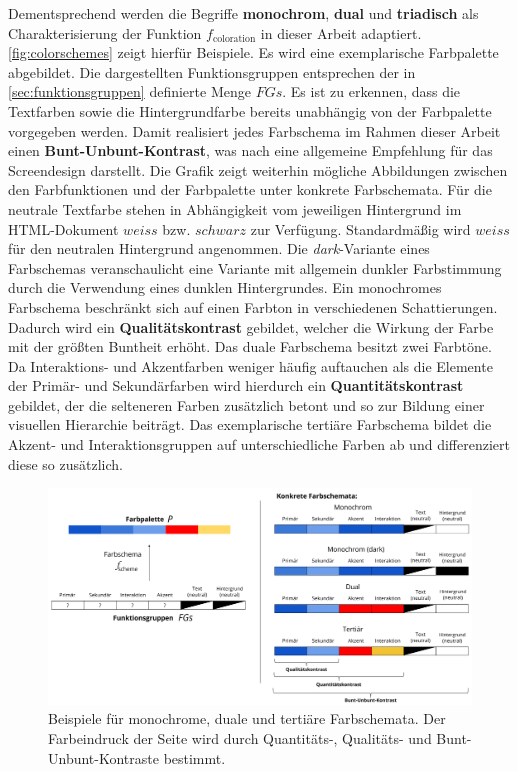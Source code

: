 Dementsprechend werden die Begriffe \textbf{monochrom}, \textbf{dual} und \textbf{triadisch} als Charakterisierung der Funktion $f_\text{coloration}$ in dieser Arbeit adaptiert. \autoref{fig:colorschemes} zeigt hierfür Beispiele. Es wird eine exemplarische Farbpalette abgebildet. Die dargestellten Funktionsgruppen entsprechen der in \autoref{sec:funktionsgruppen} definierte Menge $FGs$. Es ist zu erkennen, dass die Textfarben sowie die Hintergrundfarbe bereits unabhängig von der Farbpalette vorgegeben werden. Damit realisiert jedes Farbschema im Rahmen dieser Arbeit einen \textbf{Bunt-Unbunt-Kontrast}, was nach \citep{webx0} eine allgemeine Empfehlung für das Screendesign darstellt. Die Grafik zeigt weiterhin mögliche Abbildungen zwischen den Farbfunktionen und der Farbpalette unter \glqq{}konkrete Farbschemata\grqq{}. Für die neutrale Textfarbe stehen in Abhängigkeit vom jeweiligen Hintergrund im HTML-Dokument $weiss$ bzw. $schwarz$ zur Verfügung. Standardmäßig wird $weiss$ für den neutralen Hintergrund angenommen. Die \emph{dark}-Variante eines Farbschemas veranschaulicht eine Variante mit allgemein dunkler Farbstimmung durch die Verwendung eines dunklen Hintergrundes. Ein monochromes Farbschema beschränkt sich auf einen Farbton in verschiedenen Schattierungen. Dadurch wird ein \textbf{Qualitätskontrast} gebildet, welcher die Wirkung der Farbe mit der größten Buntheit erhöht. Das duale Farbschema besitzt zwei Farbtöne. Da Interaktions- und Akzentfarben weniger häufig auftauchen als die Elemente der Primär- und Sekundärfarben wird hierdurch ein \textbf{Quantitätskontrast} gebildet, der die selteneren Farben zusätzlich betont und so zur Bildung einer visuellen Hierarchie beiträgt. Das exemplarische tertiäre Farbschema bildet die Akzent- und Interaktionsgruppen auf unterschiedliche Farben ab und differenziert diese so zusätzlich. 

\begin{figure}[h]
	\centering
	\includegraphics[width=1\textwidth]{img/colorschemes.png}
	\caption{Beispiele für monochrome, duale und tertiäre Farbschemata. Der Farbeindruck der Seite wird durch Quantitäts-, Qualitäts- und Bunt-Unbunt-Kontraste bestimmt.}
	\label{fig:colorschemes}
\end{figure}